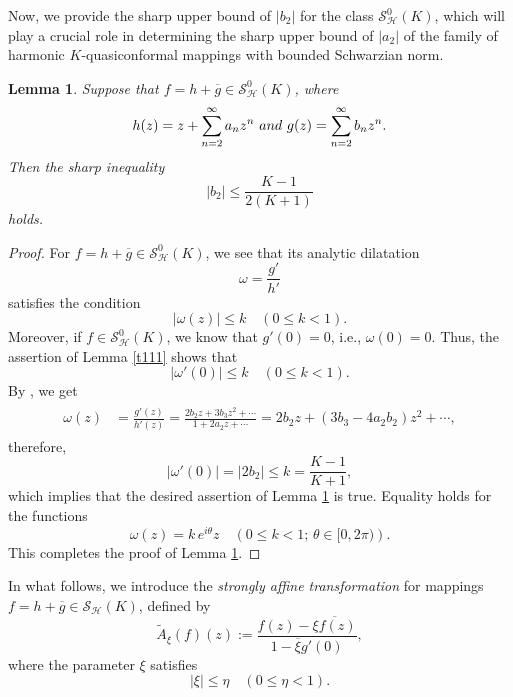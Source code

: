 \documentclass[11pt, reqno]{amsart}
\newtheorem{lemma}{Lemma}
\numberwithin{equation}{section}
\newcommand{\abs}[1]{\left\vert#1\right\vert}
\begin{document}
Now, we provide the sharp upper bound of $\abs{b_2}$ for the class $\mathcal{S}^0_\mathcal{H}(K)$, which will play a crucial role in determining the sharp upper bound of $\abs{a_2}$ of the family of harmonic $K$-quasiconformal mappings with bounded Schwarzian norm.

\begin{lemma}\label{t011}
Suppose that $f=h+\overline{g}\in\mathcal{S}^0_\mathcal{H}(K)$, where $$h(z)=z +\sum_{n=2}^{\infty}a_n z^n\ {\textit and} \ g(z)=\sum_{n=2}^{\infty}b_n z^n.$$ Then the sharp inequality \begin{equation}\label{22}\abs{b_2}\leq \frac{K-1}{2(K+1)}\end{equation}
holds.
\end{lemma}
\begin{proof}
For $f=h+\overline{g}\in\mathcal{S}^0_\mathcal{H}(K)$,
we see that its analytic dilatation $$\omega=\frac{g'}{h'}$$ satisfies the condition $$\abs{\omega(z)}\leq k\quad (0\leq k<1).$$
Moreover, if $f\in\mathcal{S}^0_\mathcal{H}(K)$, we know that $g'(0)=0$, i.e., $\omega(0)=0$. Thus, the assertion of
Lemma \ref{t111} shows that $$\abs{\omega'(0)}\leq k\quad (0\leq k<1).$$ By \cite[p. 87, Sect. 5.4]{d}, we get
 \begin{align*}
 \begin{split}\omega(z)&=\frac{g'(z)}{h'(z)}
 =\frac{2b_2z+3b_3z^2+\cdots}{1+2a_2z+\cdots}
=2b_2z+(3b_3-4a_2b_2)z^2+\cdots,
 \end{split}
\end{align*}
therefore, $$\abs{\omega'(0)}=\abs{2b_2}\leq k=\frac{K-1}{K+1},$$ which implies that the desired assertion of Lemma \ref{t011} is true. Equality holds for the functions $$\omega(z)=k\,e^{i\theta}z\quad\left(0\leq k<1;\, \theta\in[0,2\pi)\right).$$
This completes the proof of Lemma \ref{t011}.
\end{proof}

In what follows, we introduce the \textit{strongly affine transformation} for mappings \( f = h + \overline{g} \in \mathcal{S}_{\mathcal{H}}(K) \), defined by
\[
\widetilde{A}_\xi(f)(z) := \frac{f(z) - \overline{\xi f(z)}}{1 - \overline{\xi} g'(0)},
\]
where the parameter \( \xi \) satisfies
\begin{equation}
\label{111}
|\xi| \leq \eta \quad \left(0\leq\eta< 1\right).
\end{equation}
\end{document}
